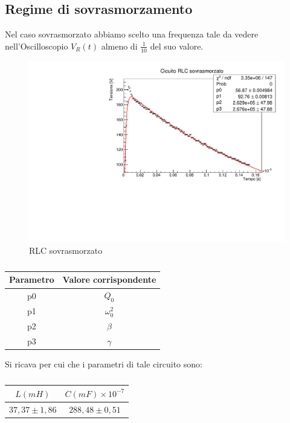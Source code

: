 \subsection{Regime di sovrasmorzamento}
Nel caso sovrasmorzato abbiamo scelto una frequenza tale da vedere nell'Oscilloscopio $V_{R}(t)$ almeno di $\frac{1}{10}$ del suo valore.
\begin{figure}[H]
    \centering
    \includegraphics[scale=.4]{Immagini/Circuito_RLC_sovrasmorzato.pdf}
    \caption{RLC sovrasmorzato}
\end{figure}
\begin{table}[H]

    \centering
    \begin{tabular}{cc}
    \toprule
      Parametro   & Valore corrispondente \\
    \midrule
       p0  & $Q_0$ \\
       p1  & $\omega_0^2$ \\
       p2  & $\beta$ \\
       p3  & $\gamma$ \\
    \bottomrule
    \end{tabular}
    \caption{}
\end{table}
Si ricava per cui che i parametri di tale circuito sono:
\begin{table}[h!]
    \centering
    \begin{tabular}{cc}
        \toprule
      $L (mH)$  & $C (mF)\times 10^{-7}$ \\
         \midrule
    $37,37 \pm 1,86$     & $288,48\pm 0,51$\\
    \bottomrule
    \end{tabular}
    \caption{}
\end{table}

